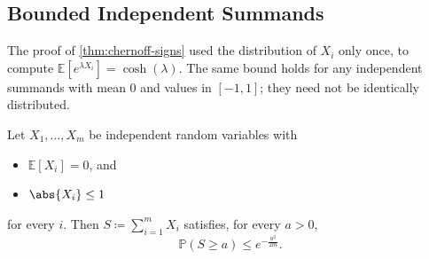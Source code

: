 \subsection{Bounded Independent Summands}\label{sec:chernoff-general}

The proof of \autoref{thm:chernoff-signs} used the distribution of \(X_{i}\) only once, to compute \(\mathbb{E}[e^{\lambda X_{i}}] = \cosh(\lambda)\). The same bound holds for any independent summands with mean \(0\) and values in \([-1, 1]\); they need not be identically distributed.

\begin{theorem}\label{thm:chernoff-general}
    Let \(X_{1}, \ldots, X_{m}\) be independent random variables with
    \begin{itemize}
        \item \(\mathbb{E}[X_{i}] = 0\), and
        \item \(\abs{X_{i}} \le 1\)
    \end{itemize}
    for every \(i\). Then \(S \coloneqq \sum_{i=1}^{m} X_{i}\) satisfies, for every \(a > 0\),
    \[
        \mathbb{P}(S \ge a) \le e^{-\frac{a^{2}}{2m}} .
    \]
\end{theorem}

